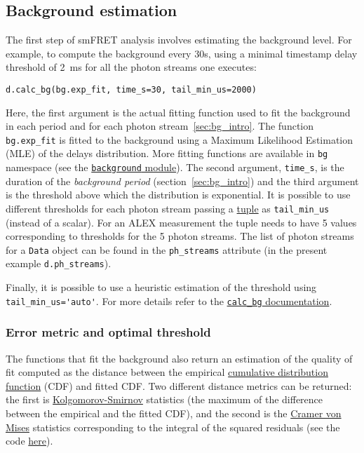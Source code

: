 \subsection{Background estimation}
\label{sec:bg_calc}

The first step of smFRET analysis involves estimating the background level. 
For example, to compute the background every 30s, using a minimal timestamp 
delay threshold of 2~ms for all the photon streams one executes: 

\begin{verbatim}
d.calc_bg(bg.exp_fit, time_s=30, tail_min_us=2000)
\end{verbatim}

Here, the first argument is the actual fitting function used to fit the
background in each period and for each photon stream~\ref{sec:bg_intro}. The function 
\verb|bg.exp_fit| is fitted to the background using a Maximum Likelihood Estimation 
(MLE) of the delays distribution. More fitting functions are available in 
\verb|bg| namespace (see the 
\href{http://fretbursts.readthedocs.org/en/latest/background.html}
{\texttt{background} module}). The second argument, \verb|time_s|, is the 
duration of the \textit{background period} (section~\ref{sec:bg_intro}) and
the third argument is the threshold above which the distribution is 
exponential. It is possible to use different thresholds 
for each photon stream passing a 
\href{https://docs.python.org/2/tutorial/datastructures.html#tuples-and-sequences}{tuple} 
as \verb|tail_min_us| (instead of a scalar). 
For an ALEX measurement the tuple needs to have 5 values 
corresponding to thresholds for the 5 photon streams. The list of photon 
streams for a \verb|Data| object can be found in the \verb|ph_streams| 
attribute (in the present example \verb|d.ph_streams|). 

Finally, it is possible to use a heuristic estimation of the threshold using 
\verb|tail_min_us='auto'|. For more details refer to the 
\href{http://fretbursts.readthedocs.org/en/latest/data\_class.html#fretbursts.burstlib.Data.calc\_bg}{\texttt{calc\_bg} documentation}.

\subsubsection{Error metric and optimal threshold}

The functions that fit the background also return an estimation of the 
quality of fit computed as the distance between the empirical 
\href{http://en.wikipedia.org/wiki/Cumulative\_distribution\_function}{cumulative distribution function} 
(CDF) and fitted CDF. Two different distance metrics can be returned: 
the first is  
\href{http://en.wikipedia.org/wiki/Kolmogorov\%E2\%80\%93Smirnov\_test}{Kolgomorov-Smirnov} 
statistics (the maximum of the difference between the empirical and the 
fitted CDF), and the second is the 
\href{http://en.wikipedia.org/wiki/Cram\%C3\%A9r\%E2\%80\%93von\_Mises\_criterion}{Cramer von Mises}
statistics corresponding to the integral of the squared residuals 
(see the code 
\href{https://github.com/tritemio/FRETBursts/blob/master/fretbursts/background.py#L40}{here}).

